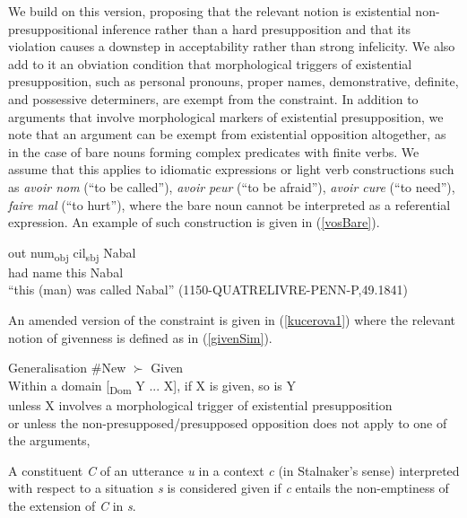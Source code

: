 \documentclass[output=paper,modfonts,nonflat]{langsci/langscibook}
\begin{document}
We build on this version, proposing that the relevant notion is existential non-presuppositional inference rather than a hard presupposition and that its violation causes a downstep in acceptability rather than strong infelicity. We also add to it an obviation condition that morphological triggers of existential presupposition, such as personal pronouns, proper names, demonstrative, definite, and possessive determiners, are exempt from the constraint. In addition to arguments that involve morphological markers of existential presupposition, we note that an argument can be exempt from existential opposition altogether, as in the case of bare nouns forming complex predicates with finite verbs. We assume that this applies to idiomatic expressions or light verb constructions such as {\itshape avoir nom} (``to be called''), {\itshape avoir peur} (``to be afraid''), {\itshape avoir cure} (``to need''), {\itshape faire mal} (``to hurt''), where the bare noun cannot be interpreted as a referential expression. An example of such construction is given in (\ref{vosBare}). 

\ea
\gll out num\textsubscript{obj} cil\textsubscript{sbj} Nabal\\
had name this Nabal\\
\glt ``this (man) was called Nabal'' \hfill (1150-QUATRELIVRE-PENN-P,49.1841) \label{vosBare}
\z 

An amended version of the constraint is given in (\ref{kucerova1}) where the relevant notion of givenness is defined as in (\ref{givenSim}).

\ea \label{kucerova1}
Generalisation \#New $\succ$ Given\\
Within a domain [\textsubscript{Dom} Y ... X], if X is given, so is Y\\
unless X involves a morphological trigger of existential presupposition\\
or unless the non-presupposed/presupposed opposition does not apply to one of the arguments,\\
\z

\ea \label{givenSim}
A constituent {\itshape C} of an utterance {\itshape u} in a context {\itshape c} (in Stalnaker's sense) interpreted with respect to a situation {\itshape s} is considered given if {\itshape c} entails the non-emptiness of the extension of {\itshape C} in {\itshape s}.
\z
\end{document}
